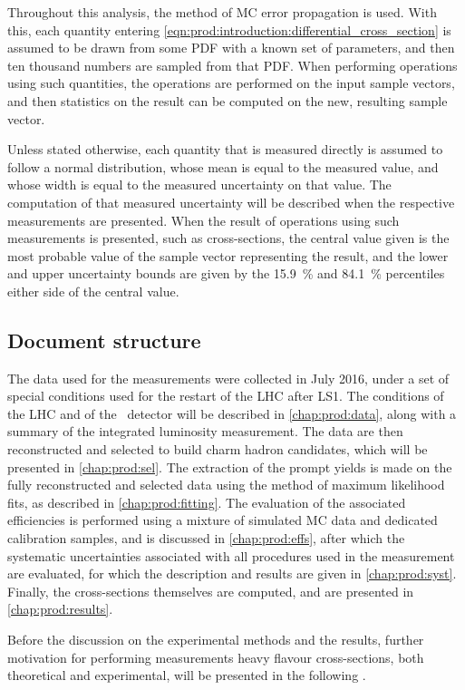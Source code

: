 Throughout this analysis, the method of \acl{MC} error propagation is used.
With this, each quantity entering 
\cref{eqn:prod:introduction:differential_cross_section} is assumed to be drawn 
from some \acf{PDF} with a known set of parameters, and then ten thousand 
numbers are sampled from that \ac{PDF}.
When performing operations using such quantities, the operations are performed 
on the input sample vectors, and then statistics on the result can be computed 
on the new, resulting sample vector.

Unless stated otherwise, each quantity that is measured directly is assumed to 
follow a normal distribution, whose mean is equal to the measured value, and 
whose width is equal to the measured uncertainty on that value.
The computation of that measured uncertainty will be described when the 
respective measurements are presented.
When the result of operations using such measurements is presented, such as 
cross-sections, the central value given is the most probable value of the 
sample vector representing the result, and the lower and upper uncertainty 
bounds are given by the \SI{15.9}{\percent} and \SI{84.1}{\percent} percentiles 
either side of the central value.


\subsection{Document structure}
\label{chap:prod:introduction:structure}

The data used for the measurements were collected in July 2016, under a set of 
special conditions used for the restart of the \ac{LHC} after \ac{LS1}.
The conditions of the \ac{LHC} and of the \lhcb\ detector will be described in 
\cref{chap:prod:data}, along with a summary of the integrated luminosity 
measurement.
The data are then reconstructed and selected to build charm hadron candidates, 
which will be presented in \cref{chap:prod:sel}.
The extraction of the prompt yields is made on the fully reconstructed and 
selected data using the method of maximum likelihood fits, as described in 
\cref{chap:prod:fitting}.
The evaluation of the associated efficiencies is performed using a mixture of 
simulated \acl{MC} data and dedicated calibration samples, and is discussed in 
\cref{chap:prod:effs}, after which the systematic uncertainties associated with 
all procedures used in the measurement are evaluated, for which the description 
and results are given in \cref{chap:prod:syst}.
Finally, the cross-sections themselves are computed, and are presented in 
\cref{chap:prod:results}.

Before the discussion on the experimental methods and the results, further 
motivation for performing measurements heavy flavour cross-sections, both 
theoretical and experimental, will be presented in the following 
.
